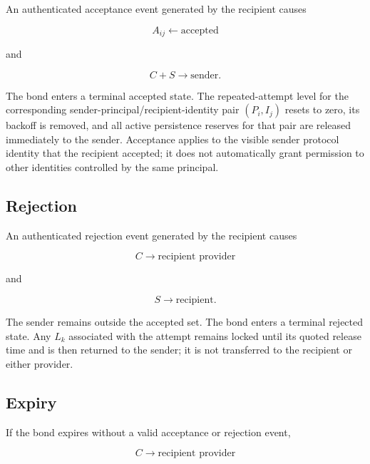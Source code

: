\documentclass[11pt]{article}
\begin{document}
An authenticated acceptance event generated by the recipient causes

\begin{equation}
A_{ij}\leftarrow\text{accepted}
\end{equation}

and

\begin{equation}
C+S\rightarrow\text{sender}.
\end{equation}

The bond enters a terminal accepted state. The repeated-attempt level for the corresponding sender-principal/recipient-identity pair $(P_i,I_j)$ resets to zero, its backoff is removed, and all active persistence reserves for that pair are released immediately to the sender. Acceptance applies to the visible sender protocol identity that the recipient accepted; it does not automatically grant permission to other identities controlled by the same principal.

\subsection*{Rejection}

An authenticated rejection event generated by the recipient causes

\begin{equation}
C\rightarrow\text{recipient provider}
\end{equation}

and

\begin{equation}
S\rightarrow\text{recipient}.
\end{equation}

The sender remains outside the accepted set. The bond enters a terminal rejected state. Any $L_k$ associated with the attempt remains locked until its quoted release time and is then returned to the sender; it is not transferred to the recipient or either provider.

\subsection*{Expiry}

If the bond expires without a valid acceptance or rejection event,

\begin{equation}
C\rightarrow\text{recipient provider}
\end{equation}
\end{document}
